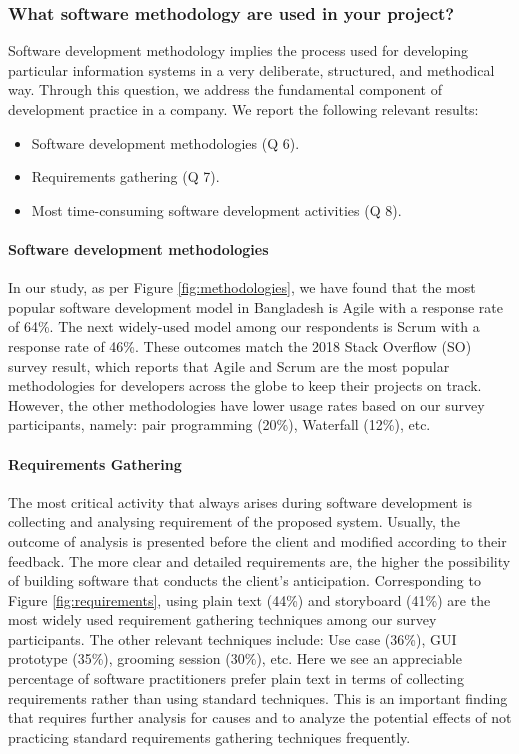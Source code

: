 \subsubsection{What software methodology are used in your project?}
\label{methodology}

Software development methodology implies the process used for developing particular information systems in a very deliberate, structured, and methodical way. Through this question, we address the fundamental component of development practice in a company. We report the following relevant results:

\begin{itemize}
\item Software development methodologies (Q 6).
\item Requirements gathering (Q 7).
\item Most time-consuming software development activities (Q 8).
\end{itemize}


\paragraph{Software development methodologies}
In our study, as per Figure \ref{fig:methodologies}, we have found that the most popular software development model in Bangladesh is Agile with a response rate of 64\%. The next widely-used model among our respondents is Scrum with a response rate of 46\%. These outcomes match the 2018 Stack Overflow (SO) survey \cite{StackoverflowSurvey2018} result, which reports that Agile and Scrum are the most popular methodologies for developers across the globe to keep their projects on track. However, the other methodologies have lower usage rates based on our survey participants, namely: pair programming (20\%), Waterfall (12\%), etc.


\paragraph{Requirements Gathering}
The most critical activity that always arises during software development is collecting and analysing requirement of the proposed system. Usually, the outcome of analysis is presented before the client and modified according to their feedback. The more clear and detailed requirements are, the higher the possibility of building software that conducts the client’s anticipation. Corresponding to Figure \ref{fig:requirements}, using plain text (44\%) and storyboard (41\%) are the most widely used requirement gathering techniques among our survey participants. The other relevant techniques include: Use case (36\%), GUI prototype (35\%), grooming session (30\%), etc. Here we see an appreciable percentage of software practitioners prefer plain text in terms of collecting requirements rather than using standard techniques. This is an important finding that requires further analysis for causes and to analyze the potential effects of not practicing standard requirements gathering techniques frequently.  

